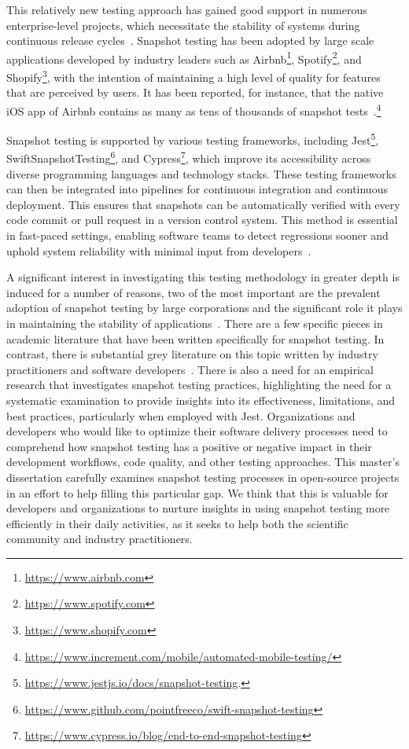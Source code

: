\documentclass[
	msc, %
	english %
]{../ppgccufmg}
\begin{document}
    This relatively new testing approach has gained good support in numerous enterpri\-se-level projects, which necessitate the stability of systems during continuous release cycles~\cite{Johnson2019}. Snapshot testing has been adopted by large scale applications developed by industry leaders such as Airbnb\footnote{\url{https://www.airbnb.com}}, Spotify\footnote{\url{https://www.spotify.com}}, and Shopify\footnote{\url{https://www.shopify.com}}, with the intention of maintaining a high level of quality for features that are perceived by users. It has been reported, for instance, that the native iOS app of Airbnb contains as many as tens of thousands of snapshot tests~\cite{Orosz2021}.\footnote{\url{https://www.increment.com/mobile/automated-mobile-testing/}}

    Snapshot testing is supported by various testing frameworks, including Jest\footnote{\url{https://www.jestjs.io/docs/snapshot-testing}.}, SwiftSnapshotTesting\footnote{\url{https://www.github.com/pointfreeco/swift-snapshot-testing}}, and Cypress\footnote{\url{https://www.cypress.io/blog/end-to-end-snapshot-testing}}, which improve its accessibility across diverse programming languages and technology stacks. These testing frameworks can then be integrated into pipelines for continuous integration and continuous deployment. This ensures that snapshots can be automatically verified with every code commit or pull request in a version control system. This method is essential in fast-paced settings, enabling software teams to detect regressions sooner and uphold system reliability with minimal input from developers~\cite{Kim2016}.

    A significant interest in investigating this testing methodology in greater depth is induced for a number of reasons, two of the most important are the prevalent adoption of snapshot testing by large corporations and the significant role it plays in maintaining the stability of applications~\cite{fujita2023empirical}. There are a few specific pieces in academic literature that have been written specifically for snapshot testing. In contrast, there is substantial grey literature on this topic written by industry practitioners and software developers~\cite{fujita2023empirical}. There is also a need for an empirical research that investigates snapshot testing practices, highlighting the need for a systematic examination to provide insights into its effectiveness, limitations, and best practices, particularly when employed with Jest. Organizations and developers who would like to optimize their software delivery processes need to comprehend how snapshot testing has a positive or negative impact in their development workflows, code quality, and other testing approaches. This master's dissertation carefully examines snapshot testing processes in open-source projects in an effort to help filling this particular gap. We think that this is valuable for developers and organizations to nurture insights in using snapshot testing more efficiently in their daily activities, as it seeks to help both the scientific community and industry practitioners. 
  
\end{document}
